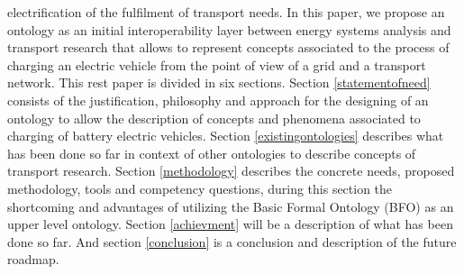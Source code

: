 electrification of the fulfilment of transport needs. In this paper, we propose
an ontology as an initial interoperability layer between energy systems
analysis and transport research that allows to represent concepts associated to
the process of charging an electric vehicle from the point of view of a grid
and a transport network. This rest paper is divided in six sections. Section
\ref{statementofneed} consists of the justification, philosophy and approach
for the designing of an ontology to allow the description of concepts and
phenomena associated to charging of battery electric vehicles. Section
\ref{existingontologies} describes what has been done so far in context of
other ontologies to describe concepts of transport research. Section
\ref{methodology} describes the concrete needs, proposed methodology, tools and
competency questions, during this section the shortcoming and advantages of
utilizing the Basic Formal Ontology (BFO) \cite{Arp.2015} as an upper level
ontology. Section \ref{achievment} will be a description of what has been done
so far. And section \ref{conclusion} is a conclusion and description of the
future roadmap.

